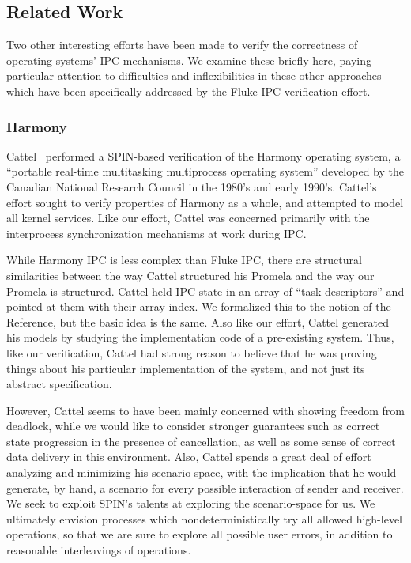 
\subsection{Related Work}

Two other interesting efforts have been made to verify the correctness
of operating systems' IPC mechanisms.  We examine these briefly here,
paying particular attention to difficulties and inflexibilities in
these other approaches which have been specifically addressed by
the Fluke IPC verification effort.

\subsubsection{Harmony}

Cattel~\cite{Harmony-verify} performed a SPIN-based verification of
the Harmony operating system, a ``portable real-time multitasking
multiprocess operating system'' developed by the Canadian National
Research Council in the 1980's and early 1990's.  Cattel's effort
sought to verify properties of Harmony as a whole, and attempted
to model all kernel services.  Like our effort, Cattel was concerned
primarily with the interprocess synchronization mechanisms at work
during IPC.

While Harmony IPC is less complex than Fluke IPC, there are structural
similarities between the way Cattel structured his Promela and the
way our Promela is structured.  Cattel held IPC state in an array of
``task descriptors'' and pointed at them with their array index.  We
formalized this to the notion of the Reference, but the basic idea is
the same.  Also like our effort, Cattel generated his models by studying
the implementation code of a pre-existing system.  Thus, like our
verification, Cattel had strong reason to believe that he was proving
things about his particular implementation of the system, and not just
its abstract specification.

However, Cattel seems to have been mainly concerned with showing
freedom from deadlock, while we would like to consider stronger
guarantees such as correct state progression in the presence of
cancellation, as well as some sense of correct data delivery in this
environment.  Also, Cattel spends a great deal of effort analyzing
and minimizing his scenario-space, with the implication that he
would generate, by hand, a scenario for every possible interaction of
sender and receiver.  We seek to exploit SPIN's talents at exploring
the scenario-space for us.  We ultimately envision processes which
nondeterministically try all allowed high-level operations, so that
we are sure to explore all possible user errors, in addition to
reasonable interleavings of operations.

